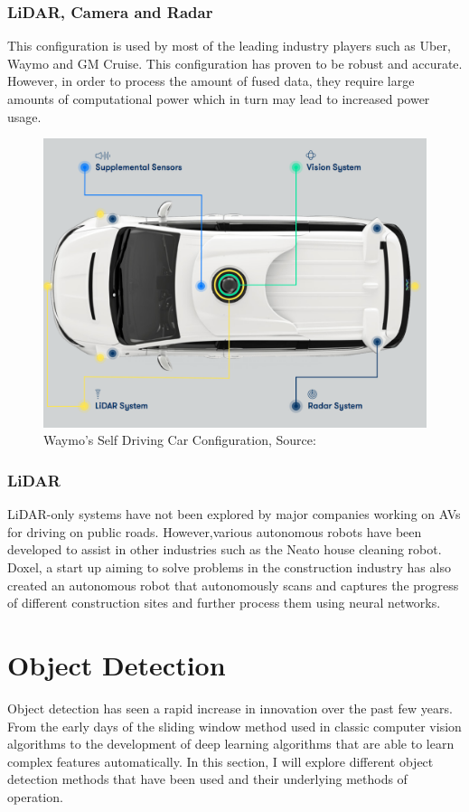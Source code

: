 \subsubsection*{LiDAR, Camera and Radar}
This configuration is used by most of the leading industry players such as Uber, Waymo and GM Cruise. This configuration has proven to be robust and accurate. However, in order to process the amount of fused data, they require large amounts of computational power which in turn may lead to increased power usage. 
\begin{figure}[t]
	\centering
	\includegraphics[width=\textwidth]{media/waymo.png}
	\caption{Waymo's Self Driving Car Configuration, Source:\cite{waymo_2018}}
	\label{fig:waymo}
\end{figure}
\subsubsection*{LiDAR }
LiDAR-only systems have not been explored by major companies working on AVs for driving on public roads. However,various autonomous robots have been developed to assist in other industries such as the Neato house cleaning robot. Doxel, a start up aiming to solve problems in the construction industry has also created an autonomous robot that autonomously scans and captures the progress of different construction sites and further process them using neural networks.
\section{Object  Detection} 
Object detection has seen a rapid increase in innovation over the past few years. From the early days of the sliding window method used in classic computer vision algorithms to the development of deep learning algorithms that are able to learn complex features automatically. 
In this section, I will explore different object detection methods that have been used and their underlying methods of operation.

